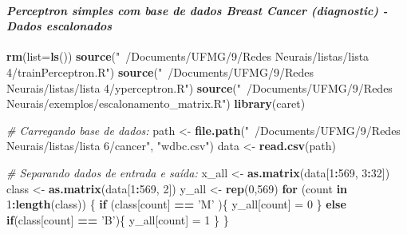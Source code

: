 \documentclass[
]{article}
\newenvironment{Shaded}{\begin{snugshade}}{\end{snugshade}}
\newcommand{\CommentTok}[1]{\textcolor[rgb]{0.56,0.35,0.01}{\textit{#1}}}
\newcommand{\ControlFlowTok}[1]{\textcolor[rgb]{0.13,0.29,0.53}{\textbf{#1}}}
\newcommand{\DataTypeTok}[1]{\textcolor[rgb]{0.13,0.29,0.53}{#1}}
\newcommand{\DecValTok}[1]{\textcolor[rgb]{0.00,0.00,0.81}{#1}}
\newcommand{\KeywordTok}[1]{\textcolor[rgb]{0.13,0.29,0.53}{\textbf{#1}}}
\newcommand{\NormalTok}[1]{#1}
\newcommand{\OperatorTok}[1]{\textcolor[rgb]{0.81,0.36,0.00}{\textbf{#1}}}
\newcommand{\StringTok}[1]{\textcolor[rgb]{0.31,0.60,0.02}{#1}}
\begin{document}
\hypertarget{perceptron-simples-com-base-de-dados-breast-cancer-diagnostic---dados-escalonados}{%
\paragraph{\texorpdfstring{\textbf{\emph{Perceptron simples com base de
dados Breast Cancer (diagnostic) - Dados
escalonados}}}{Perceptron simples com base de dados Breast Cancer (diagnostic) - Dados escalonados}}\label{perceptron-simples-com-base-de-dados-breast-cancer-diagnostic---dados-escalonados}}

\begin{Shaded}
\begin{Highlighting}[]
\KeywordTok{rm}\NormalTok{(}\DataTypeTok{list=}\KeywordTok{ls}\NormalTok{())}
\KeywordTok{source}\NormalTok{(}\StringTok{"~/Documents/UFMG/9/Redes Neurais/listas/lista 4/trainPerceptron.R"}\NormalTok{)}
\KeywordTok{source}\NormalTok{(}\StringTok{"~/Documents/UFMG/9/Redes Neurais/listas/lista 4/yperceptron.R"}\NormalTok{)}
\KeywordTok{source}\NormalTok{(}\StringTok{"~/Documents/UFMG/9/Redes Neurais/exemplos/escalonamento_matrix.R"}\NormalTok{)}
\KeywordTok{library}\NormalTok{(caret)}

\CommentTok{# Carregando base de dados:}
\NormalTok{path <-}\StringTok{ }\KeywordTok{file.path}\NormalTok{(}\StringTok{"~/Documents/UFMG/9/Redes Neurais/listas/lista 6/cancer"}\NormalTok{, }\StringTok{"wdbc.csv"}\NormalTok{)}
\NormalTok{data <-}\StringTok{ }\KeywordTok{read.csv}\NormalTok{(path)}

\CommentTok{# Separando dados de entrada e saída:}
\NormalTok{x_all <-}\StringTok{ }\KeywordTok{as.matrix}\NormalTok{(data[}\DecValTok{1}\OperatorTok{:}\DecValTok{569}\NormalTok{, }\DecValTok{3}\OperatorTok{:}\DecValTok{32}\NormalTok{])}
\NormalTok{class <-}\StringTok{ }\KeywordTok{as.matrix}\NormalTok{(data[}\DecValTok{1}\OperatorTok{:}\DecValTok{569}\NormalTok{, }\DecValTok{2}\NormalTok{])}
\NormalTok{y_all <-}\StringTok{ }\KeywordTok{rep}\NormalTok{(}\DecValTok{0}\NormalTok{,}\DecValTok{569}\NormalTok{)}
\ControlFlowTok{for}\NormalTok{ (count }\ControlFlowTok{in} \DecValTok{1}\OperatorTok{:}\KeywordTok{length}\NormalTok{(class)) \{}
  \ControlFlowTok{if}\NormalTok{ (class[count] }\OperatorTok{==}\StringTok{ 'M'}\NormalTok{ )\{}
\NormalTok{    y_all[count] =}\StringTok{ }\DecValTok{0}
\NormalTok{  \}}
  \ControlFlowTok{else} \ControlFlowTok{if}\NormalTok{(class[count] }\OperatorTok{==}\StringTok{ 'B'}\NormalTok{)\{}
\NormalTok{    y_all[count] =}\StringTok{ }\DecValTok{1}
\NormalTok{  \}}
\NormalTok{\}}


\end{Highlighting}
\end{Shaded}
\end{document}
